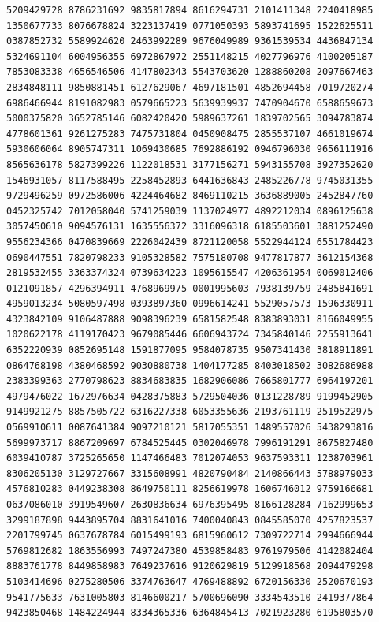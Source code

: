 \begin{Verbatim}[fontsize=\fontsize{6.4}{7.3}\selectfont]
5209429728 8786231692 9835817894 8616294731 2101411348 2240418985 1350677733 8076678824 3223137419 0771050393 5893741695 1522625511
0387852732 5589924620 2463992289 9676049989 9361539534 4436847134 5324691104 6004956355 6972867972 2551148215 4027796976 4100205187
7853083338 4656546506 4147802343 5543703620 1288860208 2097667463 2834848111 9850881451 6127629067 4697181501 4852694458 7019720274
6986466944 8191082983 0579665223 5639939937 7470904670 6588659673 5000375820 3652785146 6082420420 5989637261 1839702565 3094783874
4778601361 9261275283 7475731804 0450908475 2855537107 4661019674 5930606064 8905747311 1069430685 7692886192 0946796030 9656111916
8565636178 5827399226 1122018531 3177156271 5943155708 3927352620 1546931057 8117588495 2258452893 6441636843 2485226778 9745031355
9729496259 0972586006 4224464682 8469110215 3636889005 2452847760 0452325742 7012058040 5741259039 1137024977 4892212034 0896125638
3057450610 9094576131 1635556372 3316096318 6185503601 3881252490 9556234366 0470839669 2226042439 8721120058 5522944124 6551784423
0690447551 7820798233 9105328582 7575180708 9477817877 3612154368 2819532455 3363374324 0739634223 1095615547 4206361954 0069012406
0121091857 4296394911 4768969975 0001995603 7938139759 2485841691 4959013234 5080597498 0393897360 0996614241 5529057573 1596330911
4323842109 9106487888 9098396239 6581582548 8383893031 8166049955 1020622178 4119170423 9679085446 6606943724 7345840146 2255913641
6352220939 0852695148 1591877095 9584078735 9507341430 3818911891 0864768198 4380468592 9030880738 1404177285 8403018502 3082686988
2383399363 2770798623 8834683835 1682906086 7665801777 6964197201 4979476022 1672976634 0428375883 5729504036 0131228789 9199452905
9149921275 8857505722 6316227338 6053355636 2193761119 2519522975 0569910611 0087641384 9097210121 5817055351 1489557026 5438293816
5699973717 8867209697 6784525445 0302046978 7996191291 8675827480 6039410787 3725265650 1147466483 7012074053 9637593311 1238703961
8306205130 3129727667 3315608991 4820790484 2140866443 5788979033 4576810283 0449238308 8649750111 8256619978 1606746012 9759166681
0637086010 3919549607 2630836634 6976395495 8166128284 7162999653 3299187898 9443895704 8831641016 7400040843 0845585070 4257823537
2201799745 0637678784 6015499193 6815960612 7309722714 2994666944 5769812682 1863556993 7497247380 4539858483 9761979506 4142082404
8883761778 8449858983 7649237616 9120629819 5129918568 2094479298 5103414696 0275280506 3374763647 4769488892 6720156330 2520670193
9541775633 7631005803 8146600217 5700696090 3334543510 2419377864 9423850468 1484224944 8334365336 6364845413 7021923280 6195803570

\end{Verbatim}
